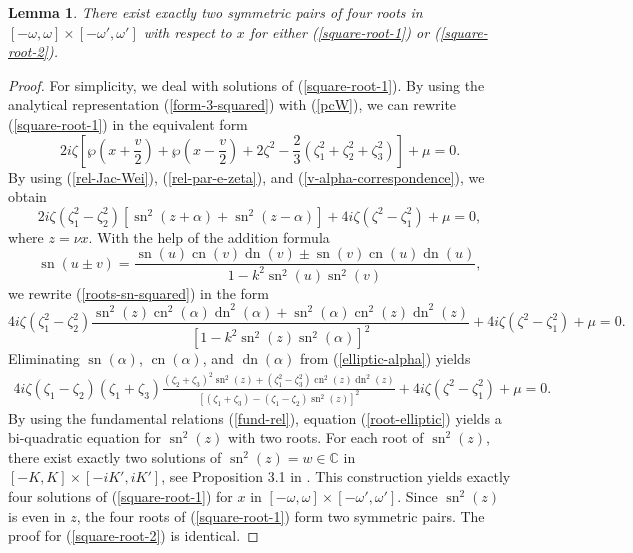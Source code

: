 \documentclass[12pt,reqno]{amsart}
\numberwithin{equation}{section}
\DeclareMathOperator{\sn}{sn}
\DeclareMathOperator{\cn}{cn}
\DeclareMathOperator{\dn}{dn}
\newtheorem{lemma}{Lemma}
\begin{document}
\begin{lemma}
	\label{prop-zeros}
There exist exactly two symmetric pairs of four roots in $[-\omega,\omega] \times [-\omega',\omega']$ with respect to $x$ for either  (\ref{square-root-1}) or (\ref{square-root-2}). 
\end{lemma}

\begin{proof}
	For simplicity, we deal with solutions of (\ref{square-root-1}). By using the analytical representation (\ref{form-3-squared}) with (\ref{pcW}), we can rewrite (\ref{square-root-1}) in the equivalent form 
	$$
	2 i \zeta \left[ \wp\left( x + \frac{v}{2} \right) + 
	\wp\left( x - \frac{v}{2} \right) + 2 \zeta^2 - \frac{2}{3} (\zeta_1^2 + \zeta_2^2 + \zeta_3^2) \right] + \mu = 0.
	$$
By using (\ref{rel-Jac-Wei}), (\ref{rel-par-e-zeta}), and (\ref{v-alpha-correspondence}), we obtain 
	\begin{equation}
	\label{roots-sn-squared}
	2 i \zeta (\zeta_1^2 - \zeta_2^2) \left[  \sn^2(z + \alpha) + \sn^2(z - \alpha) \right]  +  4i \zeta (\zeta^2 - \zeta_1^2) + \mu = 0,
	\end{equation}
	where $z = \nu x$. With the help of the addition formula
	\begin{equation*}
	\sn(u \pm v) = \frac{\sn(u) \cn(v) \dn(v) \pm \sn(v) \cn(u) \dn(u)}{1 - k^2 \sn^2(u) \sn^2(v)},
	\end{equation*}
	we rewrite (\ref{roots-sn-squared}) in the form 
	$$
	4i \zeta (\zeta_1^2 - \zeta_2^2) \frac{\sn^2(z) \cn^2(\alpha) \dn^2(\alpha) + \sn^2(\alpha) \cn^2(z) \dn^2(z)}{[1 - k^2 \sn^2(z) \sn^2(\alpha)]^2} + 
	4i \zeta (\zeta^2 - \zeta_1^2) + \mu = 0.
	$$
Eliminating $\sn(\alpha)$, $\cn(\alpha)$, and $\dn(\alpha)$ from (\ref{elliptic-alpha}) yields
	\begin{align}
4i \zeta (\zeta_1 - \zeta_2) (\zeta_1 + \zeta_3) \frac{(\zeta_2 + \zeta_3)^2 \sn^2(z) + (\zeta_1^2 - \zeta_3^2) \cn^2(z) \dn^2(z)}{[(\zeta_1 + \zeta_3) - (\zeta_1 - \zeta_2) \sn^2(z)]^2} + 4i \zeta (\zeta^2 - \zeta_1^2) + \mu = 0.
	\label{root-elliptic}
	\end{align}
By using the fundamental relations (\ref{fund-rel}), equation (\ref{root-elliptic}) yields a bi-quadratic equation for $\sn^2(z)$ with two roots. For each root of $\sn^2(z)$, there exist exactly two solutions of $\sn^2(z) = w \in \mathbb{C}$ in $[-K,K] \times [-iK',iK']$, see Proposition 3.1 in \cite{AP25}. This construction yields exactly four solutions of (\ref{square-root-1}) for $x$ in $[-\omega,\omega] \times [-\omega',\omega']$. Since $\sn^2(z)$ is even in $z$, the four roots of (\ref{square-root-1}) form two symmetric pairs. The proof for (\ref{square-root-2}) is identical.
\end{proof}
\end{document}
